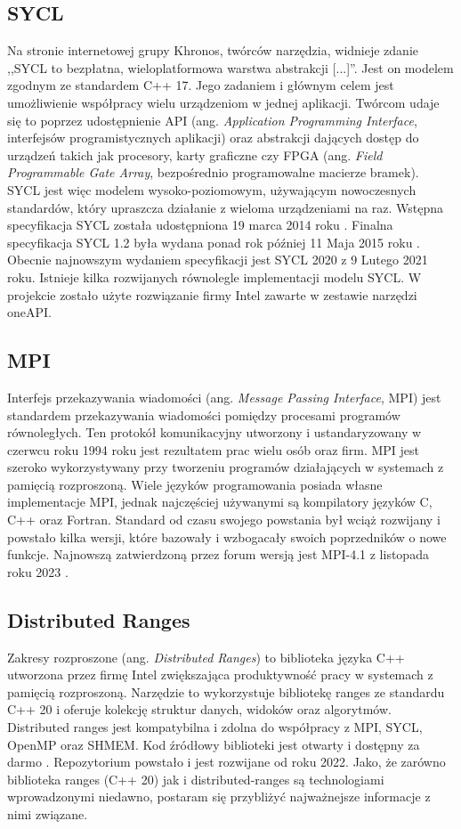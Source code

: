 \documentclass[a4paper,12pt]{book} %
\begin{document}
\subsection{SYCL}
Na stronie internetowej grupy Khronos, twórców narzędzia, widnieje zdanie ,,SYCL to bezpłatna, wieloplatformowa warstwa abstrakcji [...]''\cite{SYCL-overview}. Jest on modelem zgodnym ze standardem C++ 17. Jego zadaniem i głównym celem jest umożliwienie współpracy wielu urządzeniom w jednej aplikacji. Twórcom udaje się to poprzez udostępnienie API (ang. \emph{Application Programming Interface}, interfejsów programistycznych aplikacji) oraz abstrakcji dających dostęp do urządzeń takich jak procesory, karty graficzne czy FPGA (ang. \emph{Field Programmable Gate Array}, bezpośrednio programowalne macierze bramek). SYCL jest więc modelem wysoko-poziomowym, używającym nowoczesnych standardów, który upraszcza działanie z wieloma urządzeniami na raz. Wstępna specyfikacja SYCL została udostępniona 19 marca 2014 roku \cite{SYCL1.2-provisional}. Finalna specyfikacja SYCL 1.2 była wydana ponad rok później 11 Maja 2015 roku \cite{SYCL1.2}. Obecnie najnowszym wydaniem specyfikacji jest SYCL 2020 z 9 Lutego 2021 roku. Istnieje kilka rozwijanych równolegle implementacji modelu SYCL. W projekcie zostało użyte rozwiązanie firmy Intel zawarte w zestawie narzędzi oneAPI.
\subsection{MPI}
Interfejs przekazywania wiadomości (ang. \emph{Message Passing Interface}, MPI) jest standardem przekazywania wiadomości pomiędzy  procesami programów równoległych. Ten protokół komunikacyjny utworzony i ustandaryzowany w czerwcu roku 1994 roku jest rezultatem prac wielu osób oraz firm. MPI jest szeroko wykorzystywany przy tworzeniu programów działających w systemach z pamięcią rozproszoną. Wiele języków programowania posiada własne implementacje MPI, jednak najczęściej używanymi są kompilatory języków C, C++ oraz Fortran. Standard od czasu swojego powstania był wciąż rozwijany i powstało kilka wersji, które bazowały i wzbogacały swoich poprzedników o nowe funkcje. Najnowszą zatwierdzoną przez forum wersją jest MPI-4.1 z listopada roku 2023 \cite{mpi41}.
\subsection{Distributed Ranges}
Zakresy rozproszone (ang. \emph{Distributed Ranges}) to biblioteka języka C++ utworzona przez firmę Intel zwiększająca produktywność pracy w systemach z pamięcią rozproszoną. Narzędzie to wykorzystuje bibliotekę ranges ze standardu C++ 20 i oferuje kolekcję struktur danych, widoków oraz algorytmów. Distributed ranges jest kompatybilna i zdolna do współpracy z MPI, SYCL, OpenMP oraz SHMEM. Kod źródłowy biblioteki jest otwarty i dostępny za darmo \cite{dist-ranges}. Repozytorium powstało i jest rozwijane od roku 2022. Jako, że zarówno biblioteka ranges (C++ 20) jak i distributed-ranges są technologiami wprowadzonymi niedawno, postaram się przybliżyć najważnejsze informacje z nimi związane.
\end{document}
